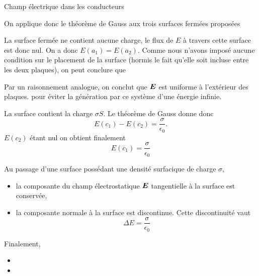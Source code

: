 \begin{corr}{Champ électrique dans les conducteurs}
\begin{corrlist}
 	 \item On applique donc le théorème de Gauss aux trois surfaces fermées
	       proposées
	       \begin{corrlist}
		       \item La surface fermée ne contient aucune charge, le flux
			     de $E$ à travers cette surface est donc nul. On a donc
			     $E(a_1) = E(a_2)$. Comme nous n'avons imposé aucune condition
			     sur le placement de la surface (hormis le fait
			     qu'elle soit incluse entre les deux plaques), on peut
			     conclure que 
		       \item Par un raisonnement analogue, on conclut que $\vece$
			     est uniforme à l'extérieur des plaques.  pour éviter la génération
		     par ce système d'une énergie infinie.
	     		\item La surface contient la charge $\sigma S$. Le théorème de
			Gauss donne donc
			\begin{equation*}
			E(c_1) - E(c_2) = \dfrac{\sigma}{\epsilon_0}.
			\end{equation*}
			$E(c_2)$ étant nul on obtient finalement
			\begin{equation*}
				E(c_1) = \dfrac{\sigma}{\epsilon_0}
			\end{equation*}
			\begin{defn}
				Au passage d'une surface possédant une densité surfacique de
				charge $\sigma$, 
				\begin{itemize}
					\item la composante du champ électrostatique
					      $\vece$ tangentielle à la surface est
					      conservée,
					 \item la composante normale à la surface est 
					       discontinue. Cette discontinuité vaut
					       \begin{equation}
						       \Delta E = \dfrac{\sigma}{\epsilon_0}
					       \end{equation}
			      \end{itemize}
			\end{defn}
			Finalement,
			\begin{itemize}
				\item {}
				\item {}
		      \end{itemize}
	       \end{corrlist}
\end{corrlist}


\end{corr}
